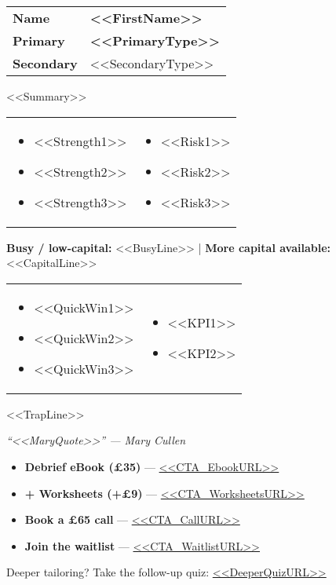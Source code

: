 \begin{tabularx}{\linewidth}{@{} l Y @{}}
\textbf{Name} & \textbf{<<FirstName>>} \\
\textbf{Primary} & \textbf{<<PrimaryType>>} \\
\textbf{Secondary} & <<SecondaryType>> \\
\end{tabularx}

{\small <<Summary>>}

\begin{tabularx}{\linewidth}{@{} Y Y @{}}
\begin{itemize}
  \item <<Strength1>>
  \item <<Strength2>>
  \item <<Strength3>>
\end{itemize}
&
\begin{itemize}
  \item <<Risk1>>
  \item <<Risk2>>
  \item <<Risk3>>
\end{itemize}
\end{tabularx}

{\small \textbf{Busy / low-capital:} <<BusyLine>> \quad | \quad \textbf{More capital available:} <<CapitalLine>>}

\begin{tabularx}{\linewidth}{@{} Y Y @{}}
\begin{itemize}
  \item <<QuickWin1>>
  \item <<QuickWin2>>
  \item <<QuickWin3>>
\end{itemize}
&
\begin{itemize}
  \item <<KPI1>>
  \item <<KPI2>>
\end{itemize}
\end{tabularx}

{\small <<TrapLine>>}

\emph{“<<MaryQuote>>” — Mary Cullen}

{\small
\begin{itemize}
  \item \textbf{Debrief eBook (£35)} — \url{<<CTA_EbookURL>>}
  \item \textbf{+ Worksheets (+£9)} — \url{<<CTA_WorksheetsURL>>}
  \item \textbf{Book a £65 call} — \url{<<CTA_CallURL>>}
  \item \textbf{Join the waitlist} — \url{<<CTA_WaitlistURL>>}
\end{itemize}
Deeper tailoring? Take the follow-up quiz: \url{<<DeeperQuizURL>>}
}
